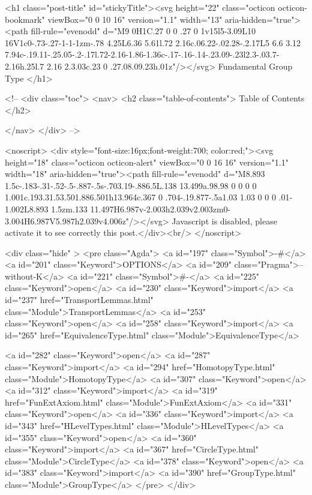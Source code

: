   <h1 class="post-title" id="stickyTitle"><svg height="22" class="octicon octicon-bookmark" viewBox="0 0 10 16" version="1.1" width="13" aria-hidden="true"><path fill-rule="evenodd" d="M9 0H1C.27 0 0 .27 0 1v15l5-3.09L10 16V1c0-.73-.27-1-1-1zm-.78 4.25L6.36 5.61l.72 2.16c.06.22-.02.28-.2.17L5 6.6 3.12 7.94c-.19.11-.25.05-.2-.17l.72-2.16-1.86-1.36c-.17-.16-.14-.23.09-.23l2.3-.03.7-2.16h.25l.7 2.16 2.3.03c.23 0 .27.08.09.23h.01z"/></svg> Fundamental Group Type
  </h1>

  <!-- 
  <div class="toc">
    <nav>
    <h2 class="table-of-contents"> Table of Contents </h2>
      

    </nav>
  </div>
   -->

  <noscript>
  <div style="font-size:16px;font-weight:700; color:red;"><svg height="18" class="octicon octicon-alert" viewBox="0 0 16 16" version="1.1" width="18" aria-hidden="true"><path fill-rule="evenodd" d="M8.893 1.5c-.183-.31-.52-.5-.887-.5s-.703.19-.886.5L.138 13.499a.98.98 0 0 0 0 1.001c.193.31.53.501.886.501h13.964c.367 0 .704-.19.877-.5a1.03 1.03 0 0 0 .01-1.002L8.893 1.5zm.133 11.497H6.987v-2.003h2.039v2.003zm0-3.004H6.987V5.987h2.039v4.006z"/></svg> Javascript is disabled, please activate it to see correctly this post.</div><br/>
  </noscript>

  <div class="hide" >
<pre class="Agda">
<a id="197" class="Symbol">{-#</a> <a id="201" class="Keyword">OPTIONS</a> <a id="209" class="Pragma">--without-K</a> <a id="221" class="Symbol">#-}</a>
<a id="225" class="Keyword">open</a> <a id="230" class="Keyword">import</a> <a id="237" href="TransportLemmas.html" class="Module">TransportLemmas</a>
<a id="253" class="Keyword">open</a> <a id="258" class="Keyword">import</a> <a id="265" href="EquivalenceType.html" class="Module">EquivalenceType</a>

<a id="282" class="Keyword">open</a> <a id="287" class="Keyword">import</a> <a id="294" href="HomotopyType.html" class="Module">HomotopyType</a>
<a id="307" class="Keyword">open</a> <a id="312" class="Keyword">import</a> <a id="319" href="FunExtAxiom.html" class="Module">FunExtAxiom</a>
<a id="331" class="Keyword">open</a> <a id="336" class="Keyword">import</a> <a id="343" href="HLevelTypes.html" class="Module">HLevelTypes</a>
<a id="355" class="Keyword">open</a> <a id="360" class="Keyword">import</a> <a id="367" href="CircleType.html" class="Module">CircleType</a>
<a id="378" class="Keyword">open</a> <a id="383" class="Keyword">import</a> <a id="390" href="GroupType.html" class="Module">GroupType</a>
</pre>
</div>

